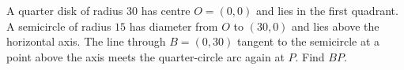 A quarter disk of radius $30$ has centre $O=(0,0)$ and lies in the first quadrant. A semicircle of radius $15$ has diameter from $O$ to $(30,0)$ and lies above the horizontal axis. The line through $B=(0,30)$ tangent to the semicircle at a point above the axis meets the quarter-circle arc again at $P$. Find $BP$.
